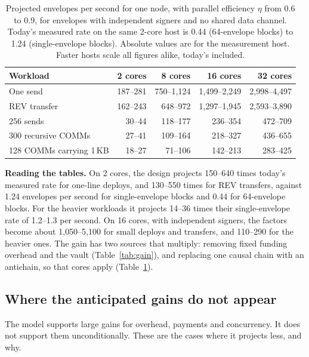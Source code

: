 \documentclass[11pt]{article}
\begin{document}
\begin{table}[h]
\centering\small
\begin{tabular}{@{}lrrrr@{}}
\toprule
\textbf{Workload} & \textbf{2 cores} & \textbf{8 cores} & \textbf{16 cores} & \textbf{32 cores} \\
\midrule
One send & 187--281 & 750--1{,}124 & 1{,}499--2{,}249 & 2{,}998--4{,}497 \\
REV transfer & 162--243 & 648--972 & 1{,}297--1{,}945 & 2{,}593--3{,}890 \\
256 sends & 30--44 & 118--177 & 236--354 & 472--709 \\
300 recursive COMMs & 27--41 & 109--164 & 218--327 & 436--655 \\
128 COMMs carrying 1\,KB & 18--27 & 71--106 & 142--213 & 283--425 \\
\bottomrule
\end{tabular}
\caption{Projected envelopes per second for one node, with parallel efficiency $\eta$ from 0.6 to 0.9, for envelopes with independent signers and no shared data channel. Today's measured rate on the same 2-core host is 0.44 (64-envelope blocks) to 1.24 (single-envelope blocks). Absolute values are for the measurement host. Faster hosts scale all figures alike, today's included.}
\label{tab:throughput}
\end{table}

\textbf{Reading the tables.} On 2 cores, the design projects 150--640 times today's measured rate for one-line deploys, and 130--550 times for REV transfers, against 1.24 envelopes per second for single-envelope blocks and 0.44 for 64-envelope blocks. For the heavier workloads it projects 14--36 times their single-envelope rate of 1.2--1.3 per second. On 16 cores, with independent signers, the factors become about 1{,}050--5{,}100 for small deploys and transfers, and 110--290 for the heavier ones. The gain has two sources that multiply: removing fixed funding overhead and the vault (Table~\ref{tab:gain}), and replacing one causal chain with an antichain, so that cores apply (Table~\ref{tab:throughput}).

\subsection{Where the anticipated gains do not appear}\label{sec:limits}

The model supports large gains for overhead, payments and concurrency. It does not support them unconditionally. These are the cases where it projects less, and why.
\end{document}
